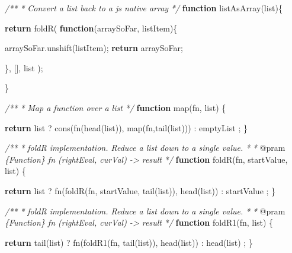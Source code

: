 \documentclass[12pt, ]{article}
\newenvironment{Shaded}{}{}
\newcommand{\KeywordTok}[1]{\textcolor[rgb]{0.00,0.44,0.13}{\textbf{{#1}}}}
\newcommand{\CommentTok}[1]{\textcolor[rgb]{0.38,0.63,0.69}{\textit{{#1}}}}
\newcommand{\OtherTok}[1]{\textcolor[rgb]{0.00,0.44,0.13}{{#1}}}
\newcommand{\FunctionTok}[1]{\textcolor[rgb]{0.02,0.16,0.49}{{#1}}}
\newcommand{\NormalTok}[1]{{#1}}
\begin{document}
\begin{Shaded}
\begin{Highlighting}[]
\CommentTok{/**}
\CommentTok{ * Convert a list back to a js native array}
\CommentTok{ */}
\KeywordTok{function} \FunctionTok{listAsArray}\NormalTok{(list)\{}

   \KeywordTok{return} \FunctionTok{foldR}\NormalTok{( }\KeywordTok{function}\NormalTok{(arraySoFar, listItem)\{}
      
      \OtherTok{arraySoFar}\NormalTok{.}\FunctionTok{unshift}\NormalTok{(listItem);}
      \KeywordTok{return} \NormalTok{arraySoFar;}
           
   \NormalTok{\}, [], list );}
   
\NormalTok{\}}

\CommentTok{/**}
\CommentTok{ * Map a function over a list }
\CommentTok{ */}
\KeywordTok{function} \FunctionTok{map}\NormalTok{(fn, list) \{}

   \KeywordTok{return} \NormalTok{list}
            \NormalTok{? }\FunctionTok{cons}\NormalTok{(}\FunctionTok{fn}\NormalTok{(}\FunctionTok{head}\NormalTok{(list)), }\FunctionTok{map}\NormalTok{(fn,}\FunctionTok{tail}\NormalTok{(list)))}
            \NormalTok{: emptyList}
            \NormalTok{;}
\NormalTok{\}}

\CommentTok{/**}
\CommentTok{ * foldR implementation. Reduce a list down to a single value.}
\CommentTok{ * }
\CommentTok{ * }\NormalTok{@pram}\CommentTok{ \{Function\} fn     (rightEval, curVal) -> result }
\CommentTok{ */}
\KeywordTok{function} \FunctionTok{foldR}\NormalTok{(fn, startValue, list) \{}
      
   \KeywordTok{return} \NormalTok{list }
            \NormalTok{? }\FunctionTok{fn}\NormalTok{(}\FunctionTok{foldR}\NormalTok{(fn, startValue, }\FunctionTok{tail}\NormalTok{(list)), }\FunctionTok{head}\NormalTok{(list))}
            \NormalTok{: startValue}
            \NormalTok{;}
\NormalTok{\}}

\CommentTok{/**}
\CommentTok{ * foldR implementation. Reduce a list down to a single value.}
\CommentTok{ * }
\CommentTok{ * }\NormalTok{@pram}\CommentTok{ \{Function\} fn     (rightEval, curVal) -> result }
\CommentTok{ */}
\KeywordTok{function} \FunctionTok{foldR1}\NormalTok{(fn, list) \{}
      
   \KeywordTok{return} \FunctionTok{tail}\NormalTok{(list) }
            \NormalTok{? }\FunctionTok{fn}\NormalTok{(}\FunctionTok{foldR1}\NormalTok{(fn, }\FunctionTok{tail}\NormalTok{(list)), }\FunctionTok{head}\NormalTok{(list))}
            \NormalTok{: }\FunctionTok{head}\NormalTok{(list)}
            \NormalTok{;}
\NormalTok{\}}



\end{Highlighting}
\end{Shaded}
\end{document}
